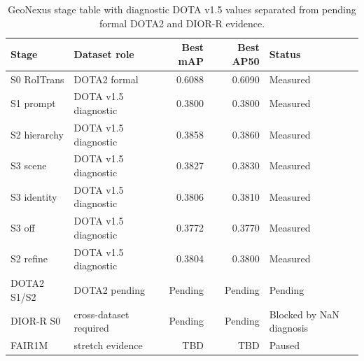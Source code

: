 \begin{table}[t]
\centering
\caption{GeoNexus stage table with diagnostic DOTA v1.5 values separated from pending formal DOTA2 and DIOR-R evidence.}
\label{tab:geonexus\_stage\_ablation}
\begin{tabular}{llrrl}
\toprule
Stage & Dataset role & Best mAP & Best AP50 & Status \\
\midrule
S0 RoITrans & DOTA2 formal & 0.6088 & 0.6090 & Measured \\
S1 prompt & DOTA v1.5 diagnostic & 0.3800 & 0.3800 & Measured \\
S2 hierarchy & DOTA v1.5 diagnostic & 0.3858 & 0.3860 & Measured \\
S3 scene & DOTA v1.5 diagnostic & 0.3827 & 0.3830 & Measured \\
S3 identity & DOTA v1.5 diagnostic & 0.3806 & 0.3810 & Measured \\
S3 off & DOTA v1.5 diagnostic & 0.3772 & 0.3770 & Measured \\
S2 refine & DOTA v1.5 diagnostic & 0.3804 & 0.3800 & Measured \\
DOTA2 S1/S2 & DOTA2 pending & Pending & Pending & Pending \\
DIOR-R S0 & cross-dataset required & Pending & Pending & Blocked by NaN diagnosis \\
FAIR1M & stretch evidence & TBD & TBD & Paused \\
\bottomrule
\end{tabular}
\end{table}
